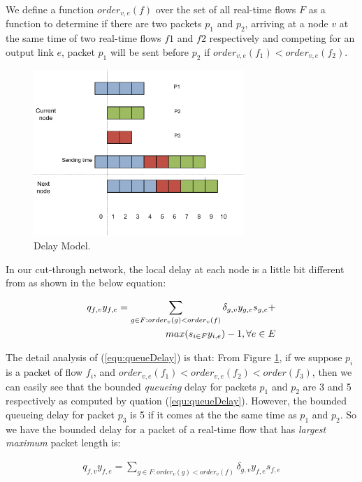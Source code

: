 \documentclass[conference, twocolumn]{IEEEtran}
\theoremstyle{definition}
\begin{document}
We define a function $order_{v,e}(f)$ over the set of all real-time flows $F$
as a function to determine if there are two packets $p_1$ and $p_2$, arriving at
a node $v$ at the same time of two real-time flows $f1$ and $f2$ respectively
and competing for an output link $e$, packet $p_1$ will be sent before $p_2$ if
$order_{v,e}(f_1) < order_{v,e}(f_2)$. 

\begin{figure}[htbp]
\centering
\includegraphics[width=8cm]{pics/DelayModel.png}
\caption[Delays for packets.]
{Delay Model.}\label{fig:DelayModel}
\end{figure}

In our cut-through network, the local delay at each node is a little bit
different from \cite{Ferrari90ascheme} as shown in the below equation:

\begin{eqnarray}\label{equ:queueDelay}
q_{f,v}y_{f,e} = \sum_{g \in F:order_v(g) <
order_v(f)}\delta_{g,v}y_{g,e}s_{g,e} + \notag \\ 
max(s_{i \in F}y_{i,e})-1, \forall e \in E
\end{eqnarray}

The detail analysis of (\ref{equ:queueDelay}) is that: From Figure
\ref{fig:DelayModel}, if we suppose $p_i$ is a packet of flow $f_i$, and
$order_{v,e}(f_1) < order_{v,e}(f_2) < order(f_3)$, then we can easily see that
the bounded {\em queueing} delay for packets $p_1$ and $p_2$ are 3 and 5
respectively as computed by quation (\ref{equ:queueDelay}). However, the bounded
queueing delay for packet $p_3$ is 5 if it comes at the the same time as $p_1$ and $p_2$. So we
have the bounded delay for a packet of a real-time flow that has {\em largest
maximum} packet length is:

\begin{eqnarray}\label{equ:queueDelayMaxPacketFlow}
q_{f,v}y_{f,e} = \sum_{g \in F:order_v(g) <
order_v(f)}\delta_{g,v}y_{f,e}s_{f,e}
\end{eqnarray}
\end{document}
